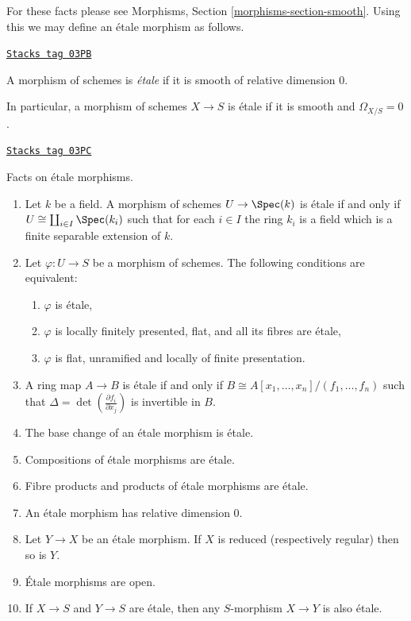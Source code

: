 \medskip\noindent
For these facts please see
Morphisms, Section \ref{morphisms-section-smooth}.
Using this we may define an \'etale morphism as follows.

\begin{definition}
\label{etale-cohomology-definition-etale-morphism}
\href{https://stacks.math.columbia.edu/tag/03PB}{\texttt{Stacks tag 03PB}}

A morphism of schemes is {\it \'etale} if it is smooth of relative dimension 0.
\end{definition}

In particular, a morphism of schemes $X \to S$ is \'etale if it is smooth
and $\Omega_{X/S} = 0$.

\begin{proposition}
\label{etale-cohomology-proposition-etale-morphisms}
\href{https://stacks.math.columbia.edu/tag/03PC}{\texttt{Stacks tag 03PC}}

Facts on \'etale morphisms.
\begin{enumerate}
\item Let $k$ be a field. A morphism of schemes $U \to \Spec(k)$ is
\'etale if and only if $U \cong \coprod_{i \in I} \Spec(k_i)$
such that for each $i \in I$
the ring $k_i$ is a field which is a finite separable extension of $k$.
\item Let $\varphi : U \to S$ be a morphism of schemes. The following
conditions are equivalent:
\begin{enumerate}
\item $\varphi$ is \'etale,
\item $\varphi$ is locally finitely presented, flat, and all its fibres are
\'etale,
\item $\varphi$ is flat, unramified and locally of finite presentation.
\end{enumerate}
\item A ring map $A \to B$ is \'etale if and only if
$B \cong A[x_1, \ldots, x_n]/(f_1, \ldots, f_n)$
such that $\Delta = \det \left( \frac{\partial f_i}{\partial x_j} \right)$
is invertible in $B$.
\item The base change of an \'etale morphism is \'etale.
\item Compositions of \'etale morphisms are \'etale.
\item Fibre products and products of \'etale morphisms are \'etale.
\item An \'etale morphism has relative dimension 0.
\item Let $Y \to X$ be an \'etale morphism.
If $X$ is reduced (respectively regular) then so is $Y$.
\item \'Etale morphisms are open.
\item If $X \to S$ and $Y \to S$ are \'etale, then any
$S$-morphism $X \to Y$ is also \'etale.
\end{enumerate}
\end{proposition}

